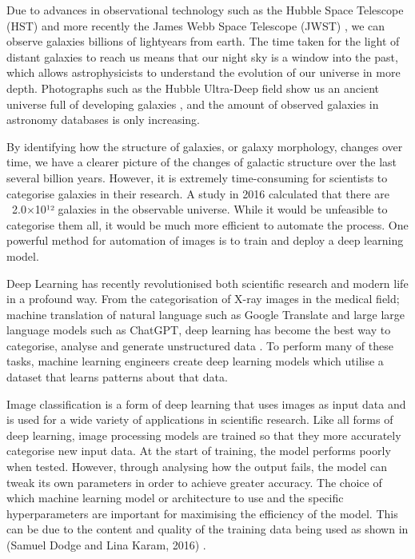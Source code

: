 \documentclass[runningheads]{llncs}
\begin{document}
Due to advances in observational technology such as the Hubble Space Telescope
(HST) and more recently the James Webb Space Telescope (JWST) \cite{JWST}, we can observe
galaxies billions of lightyears from earth. The time taken for the light of
distant galaxies to reach us means that our night sky is a window into the
past, which allows astrophysicists to understand the evolution of our universe
in more depth. Photographs such as the Hubble Ultra-Deep field show us an
ancient universe full of developing galaxies \cite{HUDF}, and the amount of observed
galaxies in astronomy databases is only increasing.

By identifying how the structure of galaxies, or galaxy morphology, changes over
time, we have a clearer picture of the changes of galactic structure over the
last several billion years. However, it is extremely time-consuming for
scientists to categorise galaxies in their research. A study in 2016 \cite{EGND}
calculated that there are ~2.0×10¹² galaxies in the observable universe. While
it would be unfeasible to categorise them all, it would be much more efficient
to automate the process. One powerful method for automation of images is to
train and deploy a deep learning model.

Deep Learning has recently revolutionised both scientific research and modern
life in a profound way. From the categorisation of X-ray images in the
medical field; machine translation of natural language such as Google Translate
and large large language models such as ChatGPT, deep learning has become the
best way to categorise, analyse and generate unstructured data \cite{DLCTW}. To perform
many of these tasks, machine learning engineers create deep learning models
which utilise a dataset that learns patterns about that data.

Image classification is a form of deep learning that uses images as input data
and is used for a wide variety of applications in scientific research. Like
all forms of deep learning, image processing models are trained so that they
more accurately categorise new input data. At the start of training, the
model performs poorly when tested. However, through analysing how the output
fails, the model can tweak its own parameters in order to achieve greater
accuracy. The choice of which machine learning model or architecture to use
and the specific hyperparameters are important for maximising the efficiency of
the model. This can be due to the content and quality of the training data
being used as shown in (Samuel Dodge and Lina Karam, 2016) \cite{UIQDNN}.
\end{document}
